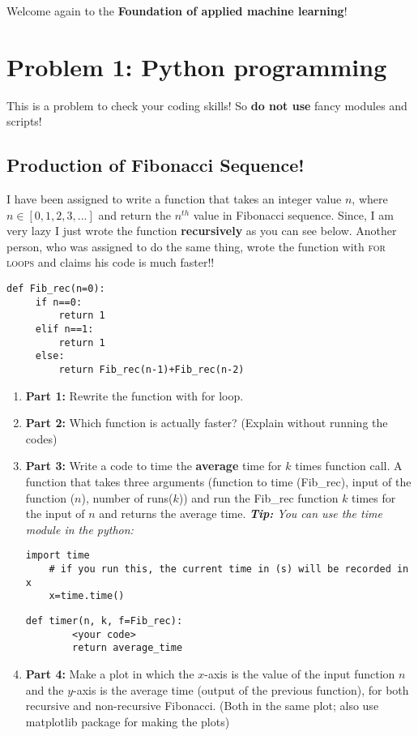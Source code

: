 \documentclass[12pt,letterpaper]{article}
\begin{document}
Welcome again to the \textbf{Foundation of applied machine learning}!

\section*{Problem 1: Python programming}
This is a problem to check your coding skills! So \textbf{do not use} fancy modules and scripts!

\subsection*{Production of Fibonacci Sequence!}
I have been assigned to write a function that takes an integer value $n$, where $n\in [0,1,2,3,...]$ and return the $n^{th}$ value in Fibonacci sequence. Since, I am very lazy I just wrote the function \textbf{recursively} as you can see below. Another person, who was assigned to do the same thing, wrote the function with \textsc{for loops} and claims his code is much faster!!

     \begin{lstlisting}[style = Python]
     def Fib_rec(n=0):
     if n==0:
         return 1
     elif n==1:
         return 1
     else:
         return Fib_rec(n-1)+Fib_rec(n-2)
    \end{lstlisting}


\begin{enumerate}
  \item
   \textbf{Part 1:} Rewrite the function with for loop.
  \item
   \textbf{Part 2:} Which function is actually faster? (Explain without running the codes)
  \item
   \textbf{Part 3:} Write a code to time the \textbf{average} time for $k$ times function call. A function that takes three arguments (function to time (Fib\_rec), input of the function ($n$), number of runs($k$)) and run the Fib\_rec function $k$ times for the input of $n$ and returns the average time.
   \textit{\textbf{Tip:} You can use the time module in the python:}
    \begin{lstlisting}[style = Python]
    import time
    # if you run this, the current time in (s) will be recorded in  x
    x=time.time()
    \end{lstlisting}

    \begin{lstlisting}[style = Python]
    def timer(n, k, f=Fib_rec):
    	<your code>
    	return average_time
    \end{lstlisting}
  \item
   \textbf{Part 4:} Make a plot in which the $x$-axis is the value of the input function $n$ and the $y$-axis is the average time (output of the previous function), for both recursive and non-recursive Fibonacci. (Both in the same plot; also use matplotlib package for making the plots)
\end{enumerate}
\end{document}
